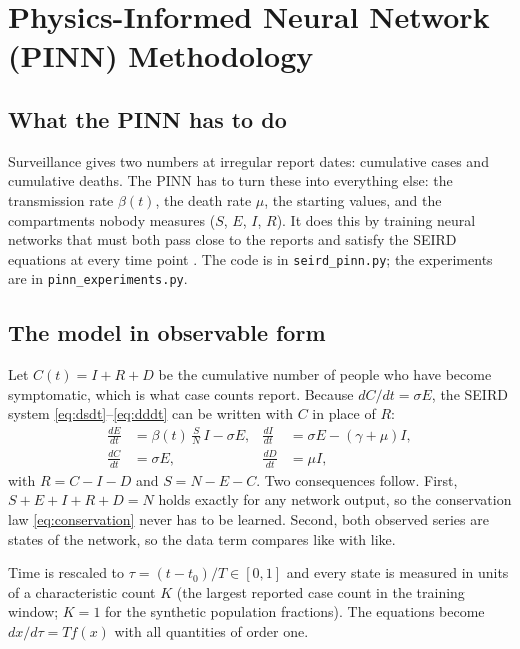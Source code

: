 \documentclass[11pt,a4paper]{article}
\begin{document}
\section{Physics-Informed Neural Network (PINN) Methodology}
\label{sec:pinn}

\subsection{What the PINN has to do}
Surveillance gives two numbers at irregular report dates: cumulative cases and cumulative deaths. The PINN has to turn these into everything else: the transmission rate $\beta(t)$, the death rate $\mu$, the starting values, and the compartments nobody measures ($S$, $E$, $I$, $R$). It does this by training neural networks that must both pass close to the reports and satisfy the SEIRD equations at every time point \cite{raissi2019physics,cuomo2022scientific}. The code is in \texttt{seird\_pinn.py}; the experiments are in \texttt{pinn\_experiments.py}.

\subsection{The model in observable form}
Let $C(t) = I + R + D$ be the cumulative number of people who have become symptomatic, which is what case counts report. Because $dC/dt = \sigma E$, the SEIRD system \eqref{eq:dsdt}--\eqref{eq:dddt} can be written with $C$ in place of $R$:
\begin{align}
    \frac{dE}{dt} &= \beta(t)\,\frac{S}{N}\,I - \sigma E, &
    \frac{dI}{dt} &= \sigma E - (\gamma+\mu) I, \\
    \frac{dC}{dt} &= \sigma E, &
    \frac{dD}{dt} &= \mu I,
\end{align}
with $R = C - I - D$ and $S = N - E - C$. Two consequences follow. First, $S + E + I + R + D = N$ holds exactly for any network output, so the conservation law \eqref{eq:conservation} never has to be learned. Second, both observed series are states of the network, so the data term compares like with like.

Time is rescaled to $\tau = (t - t_0)/T \in [0,1]$ and every state is measured in units of a characteristic count $K$ (the largest reported case count in the training window; $K = 1$ for the synthetic population fractions). The equations become $dx/d\tau = T f(x)$ with all quantities of order one.
\end{document}

